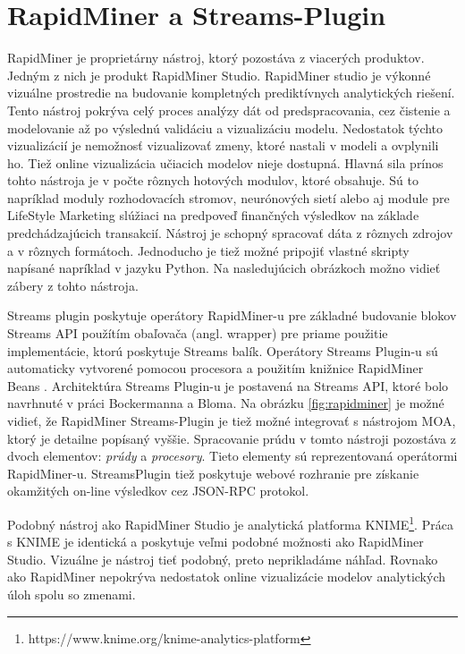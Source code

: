 \section{RapidMiner a Streams-Plugin}
RapidMiner je proprietárny nástroj, ktorý pozostáva z viacerých produktov. Jedným z nich je produkt RapidMiner Studio. RapidMiner studio je výkonné vizuálne prostredie na budovanie kompletných prediktívnych analytických riešení. Tento nástroj pokrýva celý proces analýzy dát od predspracovania, cez čistenie a modelovanie až po výslednú validáciu a vizualizáciu modelu. Nedostatok týchto vizualizácií je nemožnosť vizualizovať zmeny, ktoré nastali v modeli a ovplynili ho. Tiež online vizualizácia učiacich modelov nieje dostupná. Hlavná sila prínos tohto nástroja je v počte rôznych hotových modulov, ktoré obsahuje. Sú to napríklad moduly rozhodovacích stromov, neurónových sietí alebo aj module pre LifeStyle Marketing slúžiaci na predpoveď finančných výsledkov na základe predchádzajúcich transakcií. Nástroj je schopný spracovať dáta z rôznych zdrojov a v rôznych formátoch. Jednoducho je tiež možné pripojiť vlastné skripty napísané napríklad v jazyku Python. Na nasledujúcich obrázkoch možno vidieť zábery z tohto nástroja.

\label{fig:rapidminer-process}

\label{fig:rapidminer-tree}

Streams plugin poskytuje operátory RapidMiner-u pre základné budovanie blokov Streams API použítím obaľovača (angl. wrapper) pre priame použitie implementácie, ktorú poskytuje Streams balík. Operátory Streams Plugin-u sú automaticky vytvorené pomocou procesora a použitím knižnice RapidMiner Beans \citep{bockermann2012processing}. Architektúra Streams Plugin-u je postavená na Streams API, ktoré bolo navrhnuté v práci Bockermanna a Bloma. Na obrázku \ref{fig:rapidminer} je možné vidieť, že RapidMiner Streams-Plugin je tiež možné integrovať s nástrojom MOA, ktorý je detailne popísaný vyššie. 
\label{fig:rapidminer}
Spracovanie prúdu v tomto nástroji pozostáva z dvoch elementov: \textit{prúdy} a \textit{procesory}. Tieto elementy sú reprezentovaná operátormi RapidMiner-u. StreamsPlugin tiež poskytuje webové rozhranie pre získanie okamžitých on-line výsledkov cez JSON-RPC protokol.
\par
Podobný nástroj ako RapidMiner Studio je analytická platforma KNIME\footnote{https://www.knime.org/knime-analytics-platform}. Práca s KNIME je identická a poskytuje veľmi podobné možnosti ako RapidMiner Studio. Vizuálne je nástroj tieť podobný, preto neprikladáme náhľad. Rovnako ako RapidMiner nepokrýva nedostatok online vizualizácie modelov analytických úloh spolu so zmenami.

